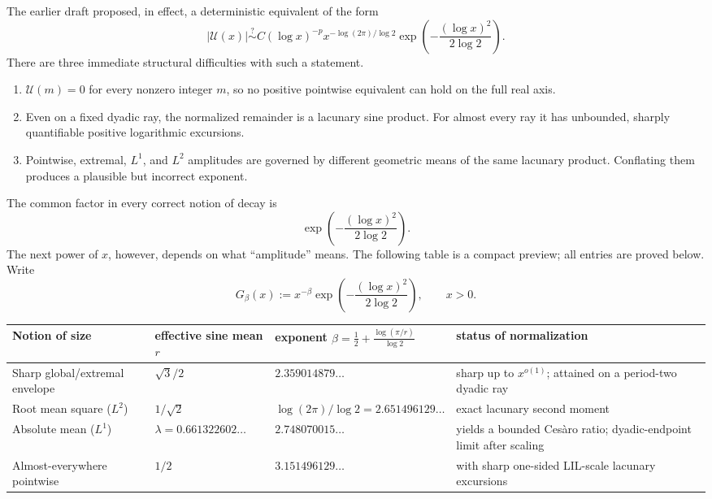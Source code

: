 \documentclass[11pt,oneside]{article}
\theoremstyle{definition}
\theoremstyle{remark}
\newcommand{\Uhat}{\mathcal U}
\begin{document}
The earlier draft proposed, in effect, a deterministic equivalent of the form
\begin{equation}\label{eq:old-form}
 |\Uhat(x)|\stackrel{?}{\sim}
 C(\log x)^{-p}x^{-\log(2\pi)/\log2}
 \exp\!\left(-\frac{(\log x)^2}{2\log2}\right).
\end{equation}
There are three immediate structural difficulties with such a statement.

\begin{enumerate}
\item $\Uhat(m)=0$ for every nonzero integer $m$, so no positive pointwise equivalent can
hold on the full real axis.
\item Even on a fixed dyadic ray, the normalized remainder is a lacunary sine product.
For almost every ray it has unbounded, sharply quantifiable positive logarithmic excursions.
\item Pointwise, extremal, $L^1$, and $L^2$ amplitudes are governed by different
geometric means of the same lacunary product.  Conflating them produces a plausible but
incorrect exponent.
\end{enumerate}

The common factor in every correct notion of decay is
\begin{equation}\label{eq:universal-lognormal}
 \exp\!\left(-\frac{(\log x)^2}{2\log2}\right).
\end{equation}
The next power of $x$, however, depends on what ``amplitude'' means.  The following table
is a compact preview; all entries are proved below.  Write
\[
 G_\beta(x):=x^{-\beta}
 \exp\!\left(-\frac{(\log x)^2}{2\log2}\right),\qquad x>0.
\]

\begin{center}
\small
\begin{tabularx}{\textwidth}{@{}>{\raggedright\arraybackslash}p{}
 >{\centering\arraybackslash}p{}
 >{\centering\arraybackslash}p{}X@{}}
\toprule
Notion of size & effective sine mean $r$ & exponent
$\displaystyle\beta=\frac12+\frac{\log(\pi/r)}{\log2}$ & status of normalization \\
\midrule
Sharp global/extremal envelope
& $\sqrt3/2$
& $2.359014879\ldots$
& sharp up to $x^{o(1)}$; attained on a period-two dyadic ray \\
Root mean square ($L^2$)
& $1/\sqrt2$
& $\log(2\pi)/\log2=2.651496129\ldots$
& exact lacunary second moment \\
Absolute mean ($L^1$)
& $\lambda=0.661322602\ldots$
& $2.748070015\ldots$
& yields a bounded Ces\`aro ratio; dyadic-endpoint limit after scaling \\
Almost-everywhere pointwise
& $1/2$
& $3.151496129\ldots$
& with sharp one-sided LIL-scale lacunary excursions \\
\bottomrule
\end{tabularx}
\end{center}
\end{document}
